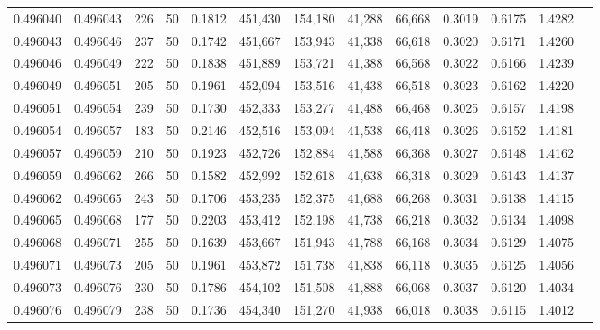 \begin{tabular}{rrrrrrrrrrrrr}
0.496040 & 0.496043 &   226 &  50 &                                     0.1812 & 451,430 & 154,180 &  41,288 &  66,668 & 0.3019 & 0.6175 & 1.4282 \\
0.496043 & 0.496046 &   237 &  50 &                                     0.1742 & 451,667 & 153,943 &  41,338 &  66,618 & 0.3020 & 0.6171 & 1.4260 \\
0.496046 & 0.496049 &   222 &  50 &                                     0.1838 & 451,889 & 153,721 &  41,388 &  66,568 & 0.3022 & 0.6166 & 1.4239 \\
0.496049 & 0.496051 &   205 &  50 &                                     0.1961 & 452,094 & 153,516 &  41,438 &  66,518 & 0.3023 & 0.6162 & 1.4220 \\
0.496051 & 0.496054 &   239 &  50 &                                     0.1730 & 452,333 & 153,277 &  41,488 &  66,468 & 0.3025 & 0.6157 & 1.4198 \\
0.496054 & 0.496057 &   183 &  50 &                                     0.2146 & 452,516 & 153,094 &  41,538 &  66,418 & 0.3026 & 0.6152 & 1.4181 \\
0.496057 & 0.496059 &   210 &  50 &                                     0.1923 & 452,726 & 152,884 &  41,588 &  66,368 & 0.3027 & 0.6148 & 1.4162 \\
0.496059 & 0.496062 &   266 &  50 &                                     0.1582 & 452,992 & 152,618 &  41,638 &  66,318 & 0.3029 & 0.6143 & 1.4137 \\
0.496062 & 0.496065 &   243 &  50 &                                     0.1706 & 453,235 & 152,375 &  41,688 &  66,268 & 0.3031 & 0.6138 & 1.4115 \\
0.496065 & 0.496068 &   177 &  50 &                                     0.2203 & 453,412 & 152,198 &  41,738 &  66,218 & 0.3032 & 0.6134 & 1.4098 \\
0.496068 & 0.496071 &   255 &  50 &                                     0.1639 & 453,667 & 151,943 &  41,788 &  66,168 & 0.3034 & 0.6129 & 1.4075 \\
0.496071 & 0.496073 &   205 &  50 &                                     0.1961 & 453,872 & 151,738 &  41,838 &  66,118 & 0.3035 & 0.6125 & 1.4056 \\
0.496073 & 0.496076 &   230 &  50 &                                     0.1786 & 454,102 & 151,508 &  41,888 &  66,068 & 0.3037 & 0.6120 & 1.4034 \\
0.496076 & 0.496079 &   238 &  50 &                                     0.1736 & 454,340 & 151,270 &  41,938 &  66,018 & 0.3038 & 0.6115 & 1.4012 \\

\end{tabular}
